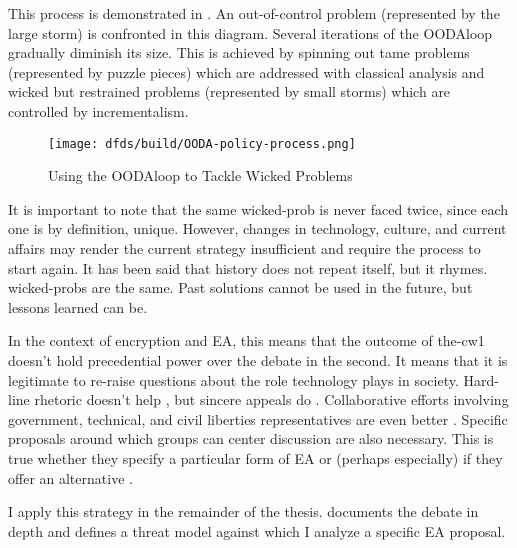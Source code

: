 This process is demonstrated in . An out-of-control problem (represented by the large
storm) is confronted in this diagram. Several iterations of the \ac{OODAloop} gradually diminish its size. This is
achieved by spinning out tame problems (represented by puzzle pieces) which are addressed with classical analysis and
wicked but restrained problems (represented by small storms) which are controlled by \ac{incrementalism}.

\begin{figure}[h]
  \centering\CaptionFontSize
  \texttt{[image: dfds/build/OODA-policy-process.png]}
  \caption{Using the \ac{OODAloop} to Tackle Wicked Problems}
  \label{fig-policy-ooda-process}
\end{figure}

It is important to note that the same \ac{wicked-prob} is never faced twice, since each one is by definition, unique.
However, changes in technology, culture, and current affairs may render the current strategy insufficient and require
the process to start again. It has been said that history does not repeat itself, but it rhymes. \Acp{wicked-prob} are
the same. Past solutions cannot be used in the future, but lessons learned can be.

In the context of \ac{encryption} and \ac{EA}, this means that the outcome of \ac{the-cw1} doesn't hold precedential
power over the debate in the second. It means that it is legitimate to re-raise questions about the role technology
plays in society. Hard-line rhetoric doesn't help \cite{ruiz_there_2018} \cite{geller_2019}, but sincere appeals do
\cite{abelson_2015} \cite{intl_2020} \cite{rozenshtein_2019}. Collaborative efforts involving government, technical, and
civil liberties representatives are even better \cite{committee_decrypting_2018} \cite{group_2019}. Specific proposals
around which groups can center discussion are also necessary. This is true whether they specify a particular form of
\ac{EA} or (perhaps especially) if they offer an alternative \cite{kerr_encryption_2017} \cite{wright_crypto_2018}
\cite{phan_key_2017}.

I apply this strategy in the remainder of the thesis.  documents the debate in depth and
 defines a threat model against which I analyze a specific \ac{EA} proposal.
